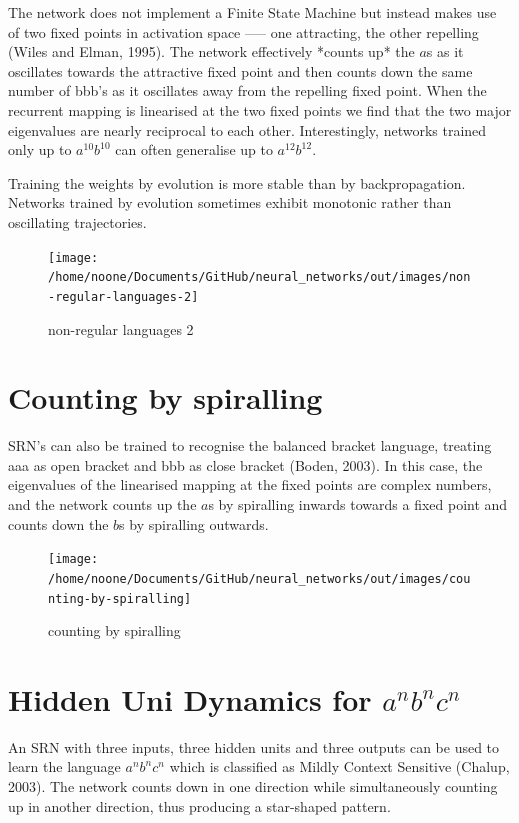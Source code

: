 \documentclass[11pt]{article}
\begin{document}
The network does not implement a Finite State Machine but instead makes use of two fixed points in activation space ––– one attracting, the other repelling (Wiles and Elman, 1995).
The network effectively *counts up* the $a$s as it oscillates towards the attractive fixed point and then counts down the same number of bbb's as it oscillates away from the repelling fixed point.
When the recurrent mapping is linearised at the two fixed points we find that the two major eigenvalues are nearly reciprocal to each other.
Interestingly, networks trained only up to $a^{10} b^{10}$ can often generalise up to $a^{12}b^{12}$.

Training the weights by evolution is more stable than by backpropagation.
Networks trained by evolution sometimes exhibit monotonic rather than oscillating trajectories.

\begin{figure}[h]
    \centering
    \texttt{[image: /home/noone/Documents/GitHub/neural\_networks/out/images/non-regular-languages-2]}
    \caption[non-regular languages 2]{non-regular languages 2}
    \label{fig: non-regular languages 2}
\end{figure}

\section{Counting by spiralling}\label{sec:counting-by-spiralling}

    SRN's can also be trained to recognise the balanced bracket language, treating aaa as open bracket and bbb as close bracket (Boden, 2003).
In this case, the eigenvalues of the linearised mapping at the fixed points are complex numbers, and the network counts up the $a$s by spiralling inwards towards a fixed point and counts down the $b$s by spiralling outwards.

\begin{figure}[Hh]
    \centering
    \texttt{[image: /home/noone/Documents/GitHub/neural\_networks/out/images/counting-by-spiralling]}
    \caption[counting by spiralling]{counting by spiralling}
    \label{fig: counting by spiralling}
\end{figure}

    \section{Hidden Uni Dynamics for $a^n b^n c^n$}\label{sec:hidden-uni-dynamics-for-$a^n-b^n-c^n$}

An SRN with three inputs, three hidden units and three outputs can be used to learn the language $a^n b^n c^n$ which is classified as Mildly Context Sensitive (Chalup, 2003).
The network counts down in one direction while simultaneously counting up in another direction, thus producing a star-shaped pattern.
\end{document}
